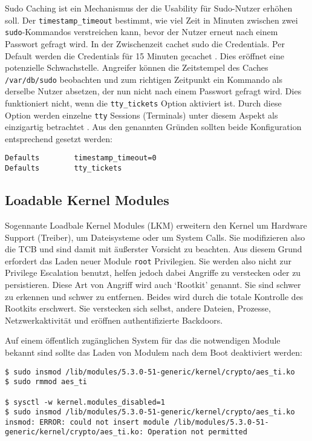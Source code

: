 Sudo Caching ist ein Mechanismus der die Usability für Sudo-Nutzer erhöhen soll. Der \texttt{timestamp\_timeout} bestimmt, wie viel Zeit in Minuten zwischen zwei \texttt{sudo}-Kommandos verstreichen kann, bevor der Nutzer erneut nach einem Passwort gefragt wird. In der Zwischenzeit cachet sudo die Credentials. Per Default werden die Credentials für 15 Minuten gecachet \cite{man-sudo}.
Dies eröffnet eine potenzielle Schwachstelle. Angreifer können die Zeitstempel des Caches \texttt{/var/db/sudo} beobachten und zum richtigen Zeitpunkt ein Kommando als derselbe Nutzer absetzen, der nun nicht nach einem Passwort gefragt wird. Dies funktioniert nicht, wenn die \texttt{tty\_tickets} Option aktiviert ist. Durch diese Option werden einzelne \texttt{tty} Sessions (Terminals) unter diesem Aspekt als einzigartig betrachtet \cite{attack-sudo-caching}.
Aus den genannten Gründen sollten beide Konfiguration entsprechend gesetzt werden:

\begin{lstlisting}
Defaults        timestamp_timeout=0
Defaults        tty_tickets 
\end{lstlisting}


\subsection{Loadable Kernel Modules}

Sogennante Loadbale Kernel Modules (LKM) erweitern den Kernel um Hardware Support (Treiber), um Dateisysteme oder um System Calls. Sie modifizieren also die TCB und sind damit mit äußerster Vorsicht zu beachten. Aus diesem Grund erfordert das Laden neuer Module \texttt{root} Privilegien. Sie werden also nicht zur Privilege Escalation benutzt, helfen jedoch dabei Angriffe zu verstecken oder zu persistieren. Diese Art von Angriff wird auch `Rootkit' genannt. Sie sind schwer zu erkennen
und schwer zu entfernen. Beides wird durch die totale Kontrolle des Rootkits erschwert. Sie verstecken sich selbst, andere Dateien, Prozesse, Netzwerkaktivität und eröffnen authentifizierte Backdoors. \cite{attack-rootkit, attack-lkm}

Auf einem öffentlich zugänglichen System für das die notwendigen Module bekannt sind sollte das Laden von Modulem nach dem Boot deaktiviert werden:

\begin{lstlisting}
$ sudo insmod /lib/modules/5.3.0-51-generic/kernel/crypto/aes_ti.ko
$ sudo rmmod aes_ti

$ sysctl -w kernel.modules_disabled=1
$ sudo insmod /lib/modules/5.3.0-51-generic/kernel/crypto/aes_ti.ko
insmod: ERROR: could not insert module /lib/modules/5.3.0-51-generic/kernel/crypto/aes_ti.ko: Operation not permitted
\end{lstlisting}

